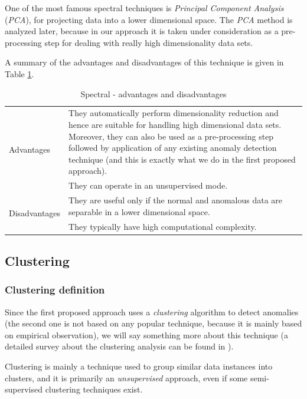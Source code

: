 \documentclass[12pt,a4paper,cucitura]{toptesi}
\begin{document}
One of the most famous spectral techniques is \emph{Principal Component Analysis} (\emph{PCA}), for projecting data into a lower dimensional space.
The \emph{PCA} method is analyzed later, because in our approach it is taken under consideration as a pre-processing step for dealing with really high dimensionality data sets.

A summary of the advantages and disadvantages of this technique is given in Table \ref{tab-spectral}.

\begin{table}
\centering
\begin{tabular}{l|p{12cm}}
\hline
\hline
\multirow{2}{*}{Advantages} & They automatically perform dimensionality reduction and hence are suitable for handling high dimensional data sets. Moreover, they can also be used as a pre-processing step followed by application of any existing anomaly detection technique (and this is exactly what we do in the first proposed approach). \\
\cline{2-2}
& They can operate in an unsupervised mode. \\ 
\hline
\multirow{2}{*}{Disadvantages} & They are useful only if the normal and anomalous data are separable in a lower dimensional space. \\
\cline{2-2}
& They typically have high computational complexity. \\
\hline
\hline
\end{tabular}
\caption{Spectral - advantages and disadvantages}
\label{tab-spectral}
\end{table}

\subsection{Clustering}

\subsubsection{Clustering definition}

Since the first proposed approach uses a \emph{clustering} algorithm to detect anomalies (the second one is not based on any popular technique, because it is mainly based on empirical observation), we will say something more about this technique (a detailed survey about the clustering analysis can be found in \cite{datamining}).

Clustering is mainly a technique used to group similar data instances into clusters, and it is primarily an \emph{unsupervised} approach, even if some semi-supervised clustering techniques exist.
\end{document}

